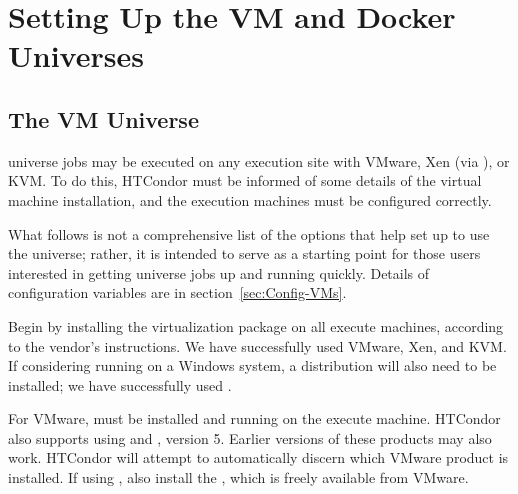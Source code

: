 \section{\label{sec:vm-install}Setting Up the VM and Docker Universes}

\subsection{\label{sec:vm-install}The VM Universe}

 universe jobs may
be executed on any execution site with VMware, Xen
(via ), or KVM.
To do this, HTCondor must be informed of some details of the 
virtual machine installation, and the execution machines must
be configured correctly.

What follows is not a comprehensive list of the options that
help set up to use the  universe; rather,
it is intended to serve as a starting point for those users interested in
getting  universe jobs up and running quickly.
Details of configuration variables are in section~\ref{sec:Config-VMs}.

Begin by installing the virtualization package on all execute machines,
according to the vendor's instructions.
We have successfully used VMware, Xen, and KVM.
If considering running on a Windows system, 
a  distribution will also need to be installed;
we have successfully used . 

For VMware,  must be installed
and running on the execute machine.
HTCondor also
supports using  and , version 5.
Earlier versions of these products may also work.  
HTCondor will attempt to automatically discern which 
VMware product is installed.
If using , also install the ,
which is freely available from VMware.

